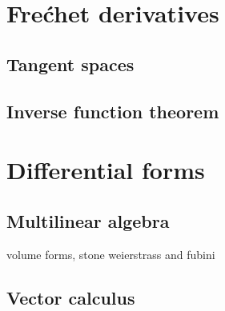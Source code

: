 \documentclass{../../large}
\begin{document}
\chapter{Fre\'chet derivatives}
\section{Tangent spaces}
\begin{prb}

\end{prb}

\section{Inverse function theorem}






\chapter{Differential forms}
\section{Multilinear algebra}

\begin{prb}
\end{prb}

\begin{prb}
\end{prb}



\begin{prb}
\end{prb}


\begin{prb}
volume forms,
stone weierstrass and fubini
\end{prb}



\section{Vector calculus}

\begin{prb}
\end{prb}
\end{document}
